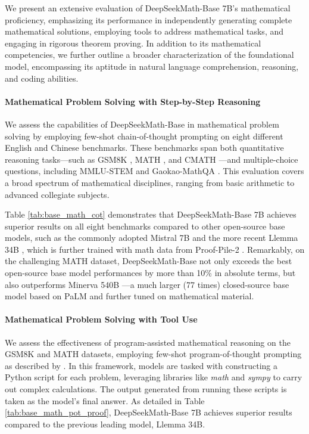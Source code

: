 \begin{itemize}[topsep=0pt]
We present an extensive evaluation of DeepSeekMath-Base 7B’s mathematical proficiency, emphasizing its performance in independently generating complete mathematical solutions, employing tools to address mathematical tasks, and engaging in rigorous theorem proving. In addition to its mathematical competencies, we further outline a broader characterization of the foundational model, encompassing its aptitude in natural language comprehension, reasoning, and coding abilities.

\paragraph{Mathematical Problem Solving with Step-by-Step Reasoning}

We assess the capabilities of DeepSeekMath-Base in mathematical problem solving by employing few-shot chain-of-thought prompting \citep{cot} on eight different English and Chinese benchmarks. These benchmarks span both quantitative reasoning tasks—such as GSM8K \citep{gsm8k}, MATH \citep{MATH}, and CMATH \citep{wei2023cmath}—and multiple-choice questions, including MMLU-STEM \citep{mmlu} and Gaokao-MathQA \citep{agieval}. This evaluation covers a broad spectrum of mathematical disciplines, ranging from basic arithmetic to advanced collegiate subjects.

Table \ref{tab:base_math_cot} demonstrates that DeepSeekMath-Base 7B achieves superior results on all eight benchmarks compared to other open-source base models, such as the commonly adopted Mistral 7B \citep{mistral} and the more recent Llemma 34B \citep{llemma}, which is further trained with math data from Proof-Pile-2 \citep{llemma}. Remarkably, on the challenging MATH dataset, DeepSeekMath-Base not only exceeds the best open-source base model performances by more than 10\% in absolute terms, but also outperforms Minerva 540B \citep{minerva}—a much larger (77 times) closed-source base model based on PaLM \citep{palm} and further tuned on mathematical material.

\paragraph{Mathematical Problem Solving with Tool Use} We assess the effectiveness of program-assisted mathematical reasoning on the GSM8K and MATH datasets, employing few-shot program-of-thought prompting as described by \citet{pot,pal}. In this framework, models are tasked with constructing a Python script for each problem, leveraging libraries like \textit{math} and \textit{sympy} to carry out complex calculations. The output generated from running these scripts is taken as the model’s final answer. As detailed in Table \ref{tab:base_math_pot_proof}, DeepSeekMath-Base 7B achieves superior results compared to the previous leading model, Llemma 34B.


\end{itemize}
